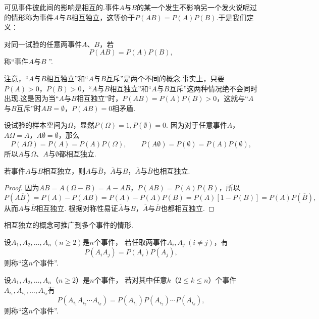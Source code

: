可见事件彼此间的影响是相互的.事件\(A\)与\(B\)的某一个发生不影响另一个发火说呢过的情形称为事件\(A\)与\(B\)相互独立，这等价于\(P(AB) = P(A) P(B)\).于是我们定义：

\begin{definition}
对同一试验的任意两事件\(A\)、\(B\)，若\[
	P(AB) = P(A) P(B),
\]称“事件\(A\)与\(B\) ”.
\end{definition}

注意，“\(A\)与\(B\)相互独立”和“\(A\)与\(B\)互斥”是两个不同的概念.事实上，只要\(P(A) > 0\)，\(P(B) > 0\)，“\(A\)与\(B\)相互独立”和“\(A\)与\(B\)互斥”这两种情况绝不会同时出现.这是因为当“\(A\)与\(B\)相互独立”时，\(P(AB) = P(A) P(B) > 0\)，这就与“\(A\)与\(B\)互斥”时\(AB = \emptyset\)，\(P(AB) = 0\)相矛盾.

设试验的样本空间为\(\Omega\)，显然\(P(\Omega) = 1, P(\emptyset) = 0\).
因为对于任意事件\(A\)，\(A \Omega = A\)，\(A \emptyset = \emptyset\)，那么\[
P(A \Omega) = P(A) = P(A) P(\Omega), \qquad
P(A \emptyset) = P(\emptyset) = P(A) P(\emptyset),
\]所以\(A\)与\(\Omega\)、\(A\)与\(\emptyset\)都相互独立.

\begin{theorem}
若事件\(A\)与\(B\)相互独立，则\(A\)与\(\overline{B}\)，\(\overline{A}\)与\(B\)，\(\overline{A}\)与\(\overline{B}\)也相互独立.
\begin{proof}
因为\(A\overline{B}=A(\Omega-B)=A-AB\)，\(P(AB)=P(A)P(B)\)，所以\[
P(A\overline{B})
= P(A) - P(AB)
= P(A) - P(A) P(B)
= P(A) [1 - P(B)]
= P(A) P(\overline{B}),
\]从而\(A\)与\(\overline{B}\)相互独立.
根据对称性易证\(\overline{A}\)与\(B\)，\(\overline{A}\)与\(\overline{B}\)也都相互独立.
\end{proof}
\end{theorem}

相互独立的概念可推广到多个事件的情形.
\begin{definition}
设\(A_1,A_2,\dotsc,A_n\ (n \geq 2)\)是\(n\)个事件，
若任取两事件\(A_i,A_j\ (i \neq j)\)，有\[
P(A_i A_j) = P(A_i) P(A_j),
\]则称“这\(n\)个事件”.
\end{definition}

\begin{definition}
设\(A_1,A_2,\dotsc,A_n\)（\(n \geq 2\)）是\(n\)个事件，
若对其中任意\(k\)（\(2 \leq k \leq n\)）个事件\(A_{i_1},A_{i_2},\dotsc,A_{i_k}\)有\[
P(A_{i_1} A_{i_2} \dotsm A_{i_k})
= P(A_{i_1}) P(A_{i_2}) \dotsm P(A_{i_k}),
\]则称“这\(n\)个事件”.
\end{definition}


